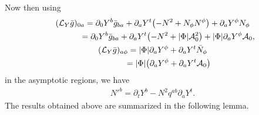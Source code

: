 \documentclass[pdftex]{sigma}
\def\ptl{\partial}%
\numberwithin{equation}{section}
\begin{document}
 Now then using
 \begin{gather*}
 	(\mathcal{L}_Y \bar{g})_{0a} =\ptl_0 Y^b \bar{g}_{ba} + \ptl_a Y^t \bigl(-N^2 + N_\phi N^\phi\bigr) + \ptl_a Y^\phi N_\phi \notag\\
 	\hphantom{(\mathcal{L}_Y \bar{g})_{0a} }{}
 = \ptl_0 Y^b \bar{g}_{ba} + \ptl_a Y^t \bigl(- N^2 + \vert \Phi\vert\mathcal{A}^2_0\bigr) + \vert \Phi \vert \ptl_a Y^\phi \mathcal{A}_0,
\\
 	(\mathcal{L}_{Y} \bar{g})_{a \phi} = \vert \Phi \vert \ptl_a Y^\phi + \ptl_a Y^t \bar{N}_\phi \notag\\
 	\hphantom{(\mathcal{L}_{Y} \bar{g})_{a \phi}}{}
 = \vert \Phi\vert \bigl(\ptl_a Y^\phi + \ptl_a Y^t \mathcal{A}_0\bigr)
 	\end{gather*}
 in the asymptotic regions, we have
 \begin{align} \label{pert-shift}
 	N'^b = \ptl_t Y^b - N^2 q^{ab} \ptl_a Y^t.
 \end{align}
The results obtained above are summarized in the following lemma.
\end{document}
